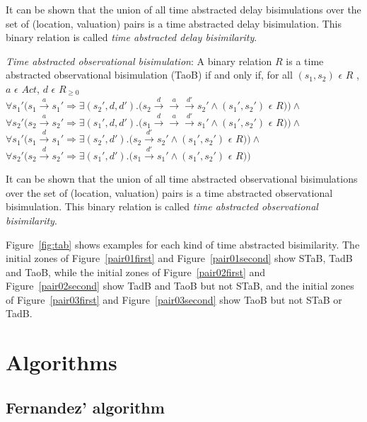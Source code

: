 \documentclass[a4paper]{llncs}
\begin{document}
It can be shown that the
  union of all time abstracted delay bisimulations over the set of
  (location, valuation) pairs is a time abstracted delay
  bisimulation. This binary relation is called \textit{time abstracted
    delay bisimilarity}.

\begin{definition}
  \emph{Time abstracted observational bisimulation}: A binary relation
  $R$ is a time abstracted observational bisimulation (TaoB) if and only if, for all
  $(s_1, s_2)$ $\epsilon$ $R$ , $a$ $\epsilon$ $Act $, $d$ $\epsilon$ $R_{\ge 0}$\\
  $\forall s_1' (s_1 \xrightarrow{a} s_1' \Rightarrow \exists (s_2',
  d, d') . (s_2 \xrightarrow{d} \xrightarrow{a} \xrightarrow{d'} s_2'
  \wedge (s_1', s_2')$ $\epsilon$ $R ) ) \wedge $ \\
  $\forall s_2' (s_2 \xrightarrow{a} s_2' \Rightarrow \exists (s_1',
  d, d') . (s_1 \xrightarrow{d} \xrightarrow{a} \xrightarrow{d'} s_1'
  \wedge (s_1', s_2')$ $\epsilon$ $R ) ) \wedge $ \\
  $\forall s_1' (s_1 \xrightarrow{d} s_1' \Rightarrow \exists (s_2',
  d')
  . (s_2 \xrightarrow{d'} s_2' \wedge (s_1', s_2')$ $\epsilon$ $R ) )
  \wedge $ \\
  $\forall s_2' (s_2 \xrightarrow{d} s_2' \Rightarrow \exists (s_1', d')
  . (s_1 \xrightarrow{d'} s_1' \wedge (s_1', s_2')$ $\epsilon$ $R ) ) $ \\
\end{definition}

It can be shown that
  the union of all time abstracted observational bisimulations over the
  set of (location, valuation) pairs is a time abstracted observational
  bisimulation. This binary relation is called \textit{time abstracted
    observational bisimilarity}.

Figure~\ref{fig:tab} shows examples for each kind of time abstracted
bisimilarity. The initial zones of Figure~\ref{pair01first} and
Figure~\ref{pair01second} show STaB, TadB and TaoB, while the initial
zones of Figure~\ref{pair02first} and Figure~\ref{pair02second} show
TadB and TaoB but not STaB, and the initial zones of Figure~\ref{pair03first} and
Figure~\ref{pair03second} show TaoB but not STaB or TadB.

\section{Algorithms}

\subsection{Fernandez' algorithm}
\end{document}
